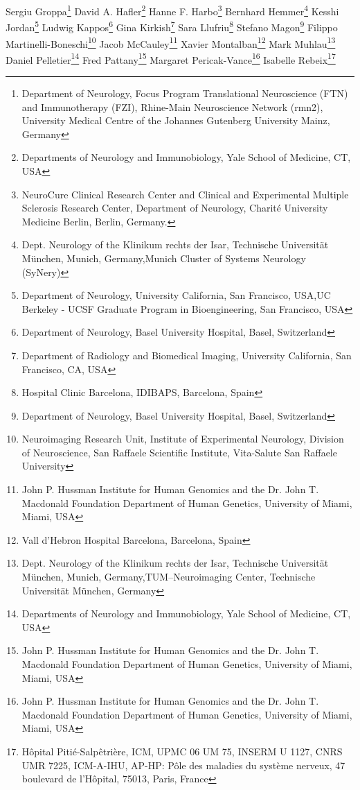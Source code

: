 Sergiu Groppa\footnote[17]{Department of Neurology, Focus Program Translational Neuroscience (FTN) and Immunotherapy (FZI), Rhine-Main Neuroscience Network (rmn2), University Medical Centre of the Johannes Gutenberg University Mainz, Germany}
David A. Hafler\footnote[18]{Departments of Neurology and Immunobiology, Yale School of Medicine, CT, USA}
Hanne F. Harbo\footnote[3]{NeuroCure Clinical Research Center and Clinical and Experimental Multiple Sclerosis Research Center, Department of Neurology, Charité University Medicine Berlin, Berlin, Germany.}
Bernhard Hemmer\footnote[19,20]{Dept. Neurology of the  Klinikum rechts der Isar, Technische Universität München, Munich, Germany,Munich Cluster of Systems Neurology (SyNery)}
Kesshi Jordan\footnote[1,2]{Department of Neurology, University California, San Francisco,  USA,UC Berkeley - UCSF Graduate Program in Bioengineering, San Francisco, USA}
Ludwig Kappos\footnote[6]{Department of Neurology, Basel University Hospital, Basel, Switzerland}
Gina Kirkish\footnote[11]{Department of Radiology and Biomedical Imaging, University California, San Francisco, CA, USA}
Sara Llufriu\footnote[21]{Hospital Clinic Barcelona, IDIBAPS, Barcelona, Spain}
Stefano Magon\footnote[6]{Department of Neurology, Basel University Hospital, Basel, Switzerland}
Filippo Martinelli-Boneschi\footnote[14]{Neuroimaging Research Unit, Institute of Experimental Neurology, Division of Neuroscience, San Raffaele Scientific Institute, Vita-Salute San Raffaele University}
Jacob McCauley\footnote[22]{John P. Hussman Institute for Human Genomics and the Dr. John T. Macdonald Foundation Department of Human Genetics, University of Miami, Miami, USA}
Xavier Montalban\footnote[10]{Vall d’Hebron Hospital Barcelona, Barcelona, Spain}
Mark Muhlau\footnote[19,23]{Dept. Neurology of the  Klinikum rechts der Isar, Technische Universität München, Munich, Germany,TUM–Neuroimaging Center, Technische Universität München, Germany}
Daniel Pelletier\footnote[18]{Departments of Neurology and Immunobiology, Yale School of Medicine, CT, USA}
Fred Pattany\footnote[22]{John P. Hussman Institute for Human Genomics and the Dr. John T. Macdonald Foundation Department of Human Genetics, University of Miami, Miami, USA}
Margaret Pericak-Vance\footnote[22]{John P. Hussman Institute for Human Genomics and the Dr. John T. Macdonald Foundation Department of Human Genetics, University of Miami, Miami, USA}
Isabelle Rebeix\footnote[15]{Hôpital Pitié-Salpêtrière, ICM, UPMC 06 UM 75, INSERM U 1127, CNRS UMR 7225, ICM-A-IHU, AP-HP: Pôle des maladies du système nerveux, 47 boulevard de l'Hôpital, 75013, Paris, France}
